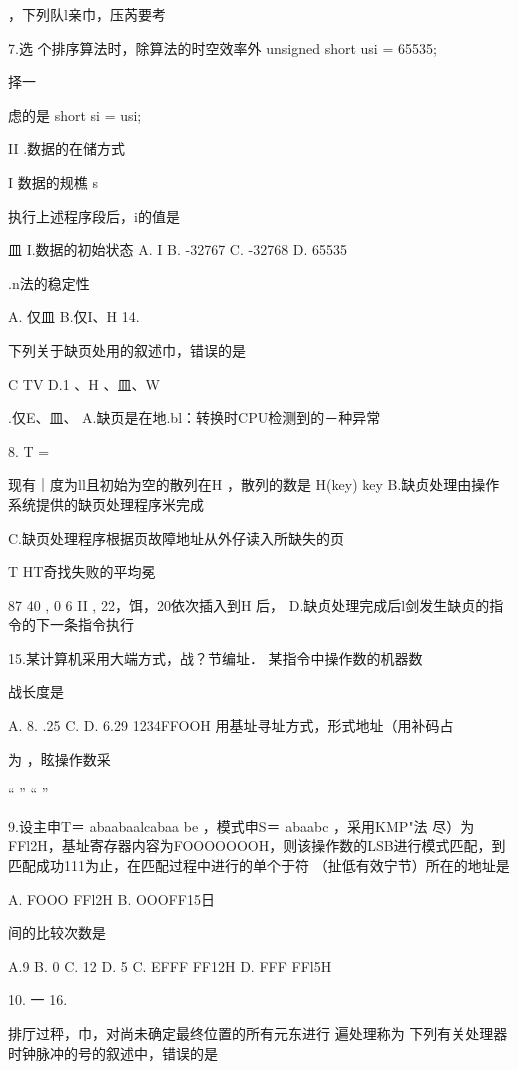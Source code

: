     ，下列队l亲巾，压芮要考

7.选   个排序算法时，除算法的时空效率外    unsigned short usi = 65535;

    择一

  虑的是    short si = usi;

    II .数据的在储方式

   I 数据的规樵    s

    执行上述程序段后，i的值是

   皿    I.数据的初始状态    A. I     B. -32767    C. -32768    D. 65535

    .n法的稳定性

   A. 仅皿    B.仅I、H    14.

    下列关于缺页处用的叙述巾，错误的是

  C    TV    D.1 、H 、皿、W

    .仅E、皿、    A.缺页是在地.bl：转换时CPU检测到的－种异常

8.    T    =

   现有｜度为ll且初始为空的散列在H ，散列的数是 H(key)  key    B.缺贞处理由操作系统提供的缺页处理程序米完成


    C.缺页处理程序根据页故障地址从外仔读入所缺失的页

    T    HT奇找失败的平均冕

   87  40 , 0  6  II , 22，饵，20依次插入到H 后，    D.缺贞处理完成后l剑发生缺贞的指令的下一条指令执行

    15.某计算机采用大端方式，战？节编址． 某指令中操作数的机器数

   战长度是

   A.      8. .25     C.      D. 6.29    1234FFOOH    用基址寻址方式，形式地址（用补码占

    为    ，眩操作数采

    “    ”    “    ”

9.设主申T＝ abaabaalcabaa be ，模式申S＝ abaabc ，采用KMP"法    尽）为FFl2H，基址寄存器内容为FOOOOOOOH，则该操作数的LSB进行模式匹配，到匹配成功111为止，在匹配过程中进行的单个于符    （扯低有效宁节）所在的地址是

    A. FOOO FFl2H     B. OOOFF15日

   间的比较次数是

   A.9    B. 0     C. 12    D. 5     C. EFFF FF12H     D. FFF FFl5H

10.    一    16.

    排厅过秤，巾，对尚未确定最终位置的所有元东进行  遍处理称为    下列有关处理器时钟脉冲的号的叙述中，错误的是

